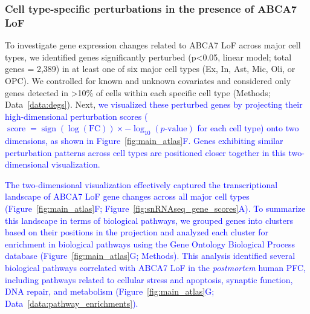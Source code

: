 \documentclass[12pt]{article}
\begin{document}
\subsubsection{Cell type-specific perturbations in the presence of ABCA7 LoF}
To investigate gene expression changes related to ABCA7 LoF across major cell types, we identified genes significantly perturbed (p<0.05, linear model; total genes = 2,389) in at least one of six major cell types (Ex, In, Ast, Mic, Oli, or OPC). We controlled for known and unknown covariates and considered only genes detected in >10\% of cells within each specific cell type (Methods; Data~\ref{data:degs}). Next, \newcommand{\quoteF}{\textcolor{blue}{we visualized these perturbed genes by projecting their high-dimensional perturbation scores ($\operatorname{score} = \operatorname{sign}(\log(\text{FC})) \times -\log_{10}(p\text{-value})$ for each cell type) onto two dimensions, as shown in Figure~\ref{fig:main_atlas}F. Genes exhibiting similar perturbation patterns across cell types are positioned closer together in this two-dimensional visualization.\label{quoteF-label}}}\quoteF

\newcommand{\quoteG}{\textcolor{blue}{The two-dimensional visualization effectively captured the transcriptional landscape of ABCA7 LoF gene changes across all major cell types (Figure~\ref{fig:main_atlas}F; Figure~\ref{fig:snRNAseq_gene_scores}A). To summarize this landscape in terms of biological pathways, we grouped genes into clusters based on their positions in the projection and analyzed each cluster for enrichment in biological pathways using the Gene Ontology Biological Process database (Figure~\ref{fig:main_atlas}G; Methods). This analysis identified several biological pathways correlated with ABCA7 LoF in the \textit{postmortem} human PFC, including pathways related to cellular stress and apoptosis, synaptic function, DNA repair, and metabolism (Figure~\ref{fig:main_atlas}G; Data~\ref{data:pathway_enrichments}).\label{quoteG-label}}}\quoteG
\end{document}
